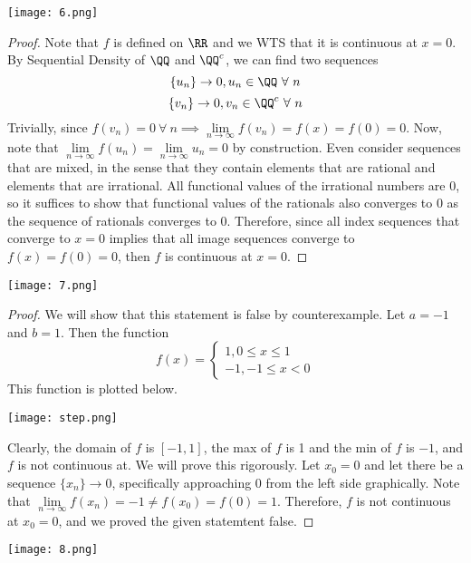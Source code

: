 \documentclass[12pt]{scrartcl}
\begin{document}
\texttt{[image: 6.png]}

\begin{proof}
  
\hfill

Note that $f$ is defined on $\RR$ and we WTS that it is continuous at $x = 0$. By 
Sequential Density of $\QQ$ and $\QQ^c$, we can find two sequences 
\[\{u_n\} \to 0, u_n \in \QQ \ \forall \ n\]
\[\{v_n\} \to 0, v_n \in \QQ^c \ \forall \ n\]
Trivially, since $f(v_n) = 0 \ \forall \ n \implies \underset{n\to\infty}{\lim}f(v_n) = f(x) = f(0) = 0$. 
Now, note that $\underset{n\to\infty}{\lim}f(u_n) = \underset{n\to\infty}{\lim}u_n = 0$
by construction. Even consider sequences that are mixed, in the sense that they contain elements that
are rational and elements that are irrational. All functional values of the irrational numbers are $0$, so it 
suffices to show that functional values of the rationals also converges to $0$ as the sequence of 
rationals converges to $0$. 
Therefore, since all index sequences that converge to $x=0$ implies that 
all image sequences converge to $f(x) = f(0) = 0$, then $f$ is continuous at $x=0$. 

\end{proof}
\newpage

\texttt{[image: 7.png]}

\begin{proof}
  
\hfill

We will show that this statement is false by counterexample. Let $a = -1$ and $b = 1$. 
Then the function 
\[f(x) = \begin{cases}
  1, 0 \leq x \leq 1\\
  -1, -1 \leq x < 0
\end{cases}\]
This function is plotted below. 

\texttt{[image: step.png]}

Clearly, the domain of $f$ is $[-1, 1]$, the max of $f$ is 1 and the min of $f$ is $-1$, and $f$
is not continuous at. We will prove this rigorously. Let $x_0 = 0$ and let there be 
a sequence $\{x_n\} \to 0$, specifically approaching $0$ from the left side graphically. 
Note that $\underset{n\to\infty}{\lim}f(x_n) = -1 \neq f(x_0) = f(0) = 1$. Therefore, 
$f$ is not continuous at $x_0 = 0$, and we proved the given statemtent false.   

\end{proof}
\newpage

\texttt{[image: 8.png]}
\end{document}
